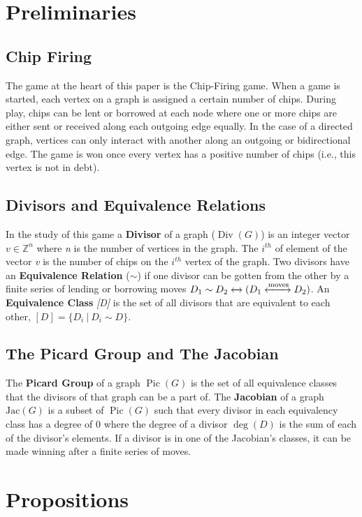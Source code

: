 \documentclass[11pt,reqno]{amsart}
\DeclareMathOperator{\Pic}{Pic}
\DeclareMathOperator{\Div}{Div}
\DeclareMathOperator{\Deg}{deg}
\newcommand{\Jac}{\textrm{Jac}}{}
\theoremstyle{definition}
\theoremstyle{plain}
\begin{document}
\section{Preliminaries}
	\subsection{Chip Firing}
		The game at the heart of this paper is the Chip-Firing game. When a game is started, each vertex on
		a graph is assigned a certain number of chips.  During play, chips can be lent or borrowed at each
		node where one or more chips are either sent or received along each outgoing edge equally.  In the
		case of a directed graph, vertices can only interact with another along an outgoing or
		bidirectional edge.  The game is won once every vertex has a positive number of chips (i.e., this
		vertex is not in debt).

	\subsection{Divisors and Equivalence Relations}
		In the study of this game a \textbf{Divisor} of a graph ($\Div(G)$) is an integer vector $v\in\mathbb{Z}^n$
		where \textit{n} is the number of vertices in the graph.  The $i^{th}$ of element of the vector \textit{v}
		is the number of chips on the $i^{th}$ vertex of the graph.  Two divisors have an \textbf{Equivalence Relation}
		($\sim$) if one divisor can be gotten from the other by a finite series of lending or borrowing moves
		$D_1 \sim D_2 \xleftrightarrow{} (D_1 \xleftrightarrow{\text{moves}} D_2)$.  An \textbf{Equivalence Class} \textit{[D]}
		is the set of all divisors that are equivalent to each other, $[D] = \{D_i~|~D_i \sim D\}$.

	\subsection{The Picard Group and The Jacobian}
		The \textbf{Picard Group} of a graph $\Pic(G)$ is the set of all equivalence classes that the divisors of that graph can be a
		part of. The \textbf{Jacobian} of a graph  $\Jac(G)$ is a subset of $\Pic(G)$ such that every divisor in each
		equivalency class has a degree of $0$ where the degree of a divisor $\Deg(D)$ is the sum of each of the divisor's elements.
		If a divisor is in one of the Jacobian's classes, it can be made winning after a finite series of moves.

\section{Propositions}
\end{document}

